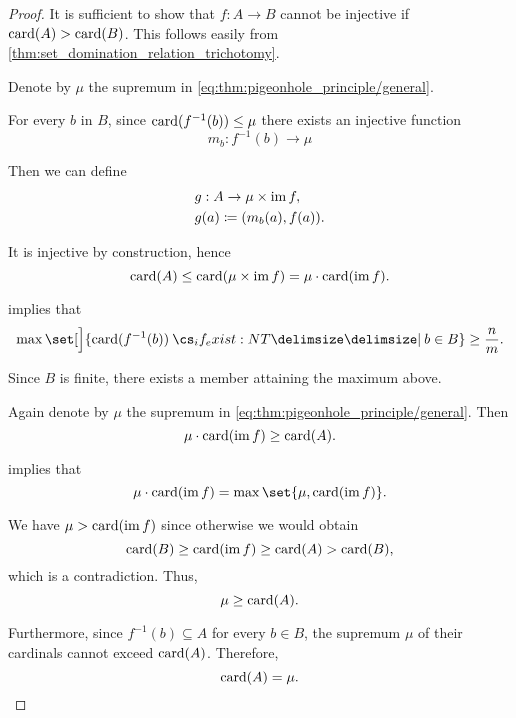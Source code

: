 \begin{proof}
   It is sufficient to show that \( f: A \to B \) cannot be injective if \( \operatorname{card}(A) > \operatorname{card}(B) \). This follows easily from \cref{thm:set_domination_relation_trichotomy}.

   Denote by \( \mu \) the supremum in \eqref{eq:thm:pigeonhole_principle/general}.

  For every \( b \) in \( B \), since \( \operatorname{card}(f^{-1}(b)) \leq \mu \) there exists an injective function
  \begin{equation*}
    m_b: f^{-1}(b) \to \mu
  \end{equation*}

  Then we can define
  \begin{equation*}
    \begin{aligned}
      &g: A \to \mu \times \operatorname{im} f, \\
      &g(a) \coloneqq (m_b(a), f(a)).
    \end{aligned}
  \end{equation*}

  It is injective by construction, hence
  \begin{equation*}
    \operatorname{card}(A) \leq \operatorname{card}(\mu \times \operatorname{im} f) = \mu \cdot \operatorname{card}(\operatorname{im} f).
  \end{equation*}

    implies that
  \begin{equation*}
    \max\set[\Big]{ \card(f^{-1}(b)) \given* b \in B } \geq \frac n m.
  \end{equation*}

  Since \( B \) is finite, there exists a member attaining the maximum above.

   Again denote by \( \mu \) the supremum in \eqref{eq:thm:pigeonhole_principle/general}. Then
  \begin{equation*}
    \mu \cdot \operatorname{card}(\operatorname{im} f) \geq \operatorname{card}(A).
  \end{equation*}

   implies that
  \begin{equation*}
    \mu \cdot \card(\img f) = \max\set{ \mu, \card(\img f) }.
  \end{equation*}

  We have \( \mu > \operatorname{card}(\operatorname{im} f) \) since otherwise we would obtain
  \begin{equation*}
    \operatorname{card}(B) \geq \operatorname{card}(\operatorname{im} f) \geq \operatorname{card}(A) > \operatorname{card}(B),
  \end{equation*}
  which is a contradiction. Thus,
  \begin{equation*}
    \mu \geq \operatorname{card}(A).
  \end{equation*}

  Furthermore, since \( f^{-1}(b) \subseteq A \) for every \( b \in B \), the supremum \( \mu \) of their cardinals cannot exceed \( \operatorname{card}(A) \). Therefore,
  \begin{equation*}
    \operatorname{card}(A) = \mu.
  \end{equation*}
\end{proof}

